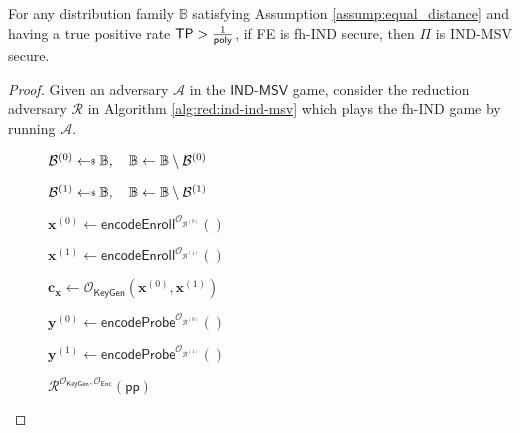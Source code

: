\begin{theorem}
For any distribution family $\mathbb{B}$ satisfying Assumption \ref{assump:equal_distance} and having a true positive rate $\textsf{TP} > \frac{1}{\mathsf{poly}}$, if \textsf{FE} is fh-IND secure, then $\Pi$ is IND-MSV secure.

\end{theorem}



\begin{proof}

Given an adversary $\mathcal{A}$ in the $\textsf{IND-MSV}$ game, consider the reduction adversary $\mathcal{R}$ in Algorithm \ref{alg:red:ind-ind-msv} which plays the \textsf{fh-IND} game by running $\mathcal{A}$.

\begin{figure}[h]
\centering
	
	\begin{minipage}[t]{0.5\linewidth}
	\centering
	\begin{algorithm}[H]
	\caption{$\mathcal{R}^{\mathcal{O}_{\textsf{KeyGen}}, \mathcal{O}_{\textsf{Enc}}}(\textsf{pp})$}
	\label{alg:red:ind-ind-msv}
	\begin{algorithmic}[1]
		\State $\mathcal{B}^{(0)} \getsdollar \mathbb{B}, \quad \mathbb{B} \gets \mathbb{B} \setminus \mathcal{B}^{(0)}$ \label{alg:red:ind-ind-msv:B0}
		
		\State $\mathcal{B}^{(1)} \getsdollar \mathbb{B}, \quad \mathbb{B} \gets \mathbb{B} \setminus \mathcal{B}^{(1)}$ \label{alg:red:ind-ind-msv:B1}

		\State $\mathbf{x}^{(0)} \gets \textsf{encodeEnroll}^{\mathcal{O}_{\mathcal{B}^{(0)}}}()$
		
		\State $\mathbf{x}^{(1)} \gets \textsf{encodeEnroll}^{\mathcal{O}_{\mathcal{B}^{(1)}}}()$
		
		\State $\mathbf{c_x} \gets \mathcal{O}_{\textsf{KeyGen}}(\mathbf{x}^{(0)}, \mathbf{x}^{(1)})$ \label{alg:red:ind-ind-msv:cx}

			
			\State $\mathbf{y}^{(0)} \gets \textsf{encodeProbe}^{\mathcal{O}_{\mathcal{B}^{(0)}}}()$

			\Repeat 

			\State $\mathbf{y}^{(1)} \gets \textsf{encodeProbe}^{\mathcal{O}_{\mathcal{B}^{(1)}}}()$

			 \label{alg:red:ind-ind-msv:while}


\end{algorithmic}
\end{algorithm}
\end{minipage}
\end{figure}
\end{proof}
